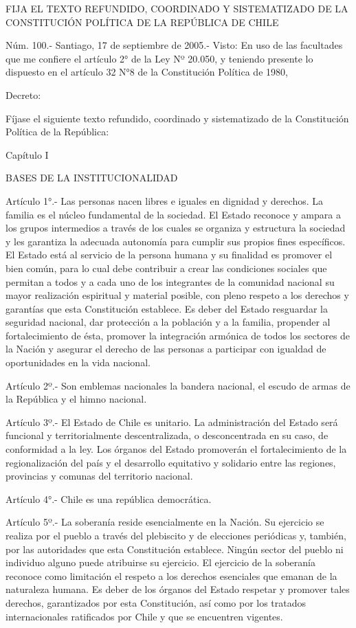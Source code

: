 FIJA EL TEXTO REFUNDIDO, COORDINADO Y SISTEMATIZADO DE LA CONSTITUCIÓN POLÍTICA DE LA REPÚBLICA DE CHILE

          Núm. 100.- Santiago, 17 de septiembre de 2005.-
    Visto: En uso de las facultades que me confiere el artículo 2° de la Ley Nº 20.050, y teniendo presente lo dispuesto en el artículo 32 N°8 de la Constitución Política de 1980,

          Decreto:

          Fíjase el siguiente texto refundido, coordinado y sistematizado de la Constitución Política de la República:


    Capítulo I

    BASES DE LA INSTITUCIONALIDAD



    Artículo 1°.- Las personas nacen libres e iguales en dignidad y derechos.
    La familia es el núcleo fundamental de la sociedad.
    El Estado reconoce y ampara a los grupos intermedios a través de los cuales se organiza y estructura la sociedad y les garantiza la adecuada autonomía para cumplir sus propios fines específicos.
    El Estado está al servicio de la persona humana y su finalidad es promover el bien común, para lo cual debe contribuir a crear las condiciones sociales que permitan a todos y a cada uno de los integrantes de la comunidad nacional su mayor realización espiritual y material posible, con pleno respeto a los derechos y garantías que esta Constitución establece.
    Es deber del Estado resguardar la seguridad nacional, dar protección a la población y a la familia, propender al fortalecimiento de ésta, promover la integración armónica de todos los sectores de la Nación y asegurar el derecho de las personas a participar con igualdad de oportunidades en la vida nacional.


    Artículo 2º.- Son emblemas nacionales la bandera nacional, el escudo de armas de la República y el himno nacional.


    Artículo 3º.- El Estado de Chile es unitario.
    La administración del Estado será funcional y territorialmente descentralizada, o desconcentrada en su caso, de conformidad a la ley.
    Los órganos del Estado promoverán el fortalecimiento de la regionalización del país y el desarrollo equitativo y solidario entre las regiones, provincias y comunas del territorio nacional.


    Artículo 4°.- Chile es una república democrática.


    Artículo 5º.- La soberanía reside esencialmente en la Nación. Su ejercicio se realiza por el pueblo a través del plebiscito y de elecciones periódicas y, también, por las autoridades que esta Constitución establece. Ningún sector del pueblo ni individuo alguno puede atribuirse su ejercicio.
    El ejercicio de la soberanía reconoce como limitación el respeto a los derechos esenciales que emanan de la naturaleza humana. Es deber de los órganos del Estado respetar y promover tales derechos, garantizados por esta Constitución, así como por los tratados internacionales ratificados por Chile y que se encuentren vigentes.


